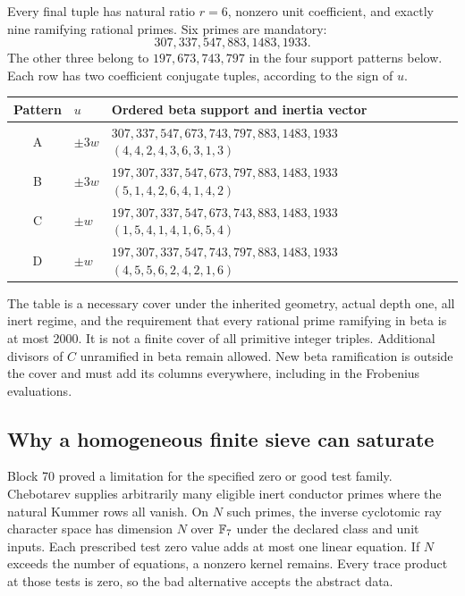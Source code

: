 Every final tuple has natural ratio $r=6$, nonzero unit coefficient, and exactly nine ramifying rational primes. Six primes are mandatory:
\[
307,337,547,883,1483,1933.
\]
The other three belong to $197,673,743,797$ in the four support patterns below. Each row has two coefficient conjugate tuples, according to the sign of $u$.
\begin{center}\small
\begin{tabular}{clp{82mm}}\toprule
Pattern&$u$&Ordered beta support and inertia vector\\\midrule
A&$\pm3w$&$307,337,547,673,743,797,883,1483,1933$\newline $(4,4,2,4,3,6,3,1,3)$\\[5pt]
B&$\pm3w$&$197,307,337,547,673,797,883,1483,1933$\newline $(5,1,4,2,6,4,1,4,2)$\\[5pt]
C&$\pm w$&$197,307,337,547,673,743,883,1483,1933$\newline $(1,5,4,1,4,1,6,5,4)$\\[5pt]
D&$\pm w$&$197,307,337,547,743,797,883,1483,1933$\newline $(4,5,5,6,2,4,2,1,6)$\\\bottomrule
\end{tabular}
\end{center}
The table is a necessary cover under the inherited geometry, actual depth one, all inert regime, and the requirement that every rational prime ramifying in beta is at most 2000. It is not a finite cover of all primitive integer triples. Additional divisors of $C$ unramified in beta remain allowed. New beta ramification is outside the cover and must add its columns everywhere, including in the Frobenius evaluations.

\subsection{Why a homogeneous finite sieve can saturate}
Block 70 proved a limitation for the specified zero or good test family. Chebotarev supplies arbitrarily many eligible inert conductor primes where the natural Kummer rows all vanish. On $N$ such primes, the inverse cyclotomic ray character space has dimension $N$ over $\mathbb F_7$ under the declared class and unit inputs. Each prescribed test zero value adds at most one linear equation. If $N$ exceeds the number of equations, a nonzero kernel remains. Every trace product at those tests is zero, so the bad alternative accepts the abstract data.

